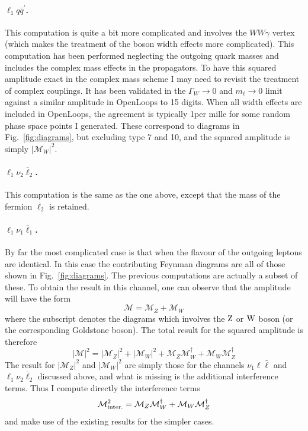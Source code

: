 \documentclass[a4paper,11pt]{article}
\def \beq{\begin{equation}}
\def \eeq{\end{equation}}
\begin{document}
\paragraph{$\ell_1q\bar q^{\prime}$.}
This computation is quite a bit more complicated and involves the $WW\gamma$ vertex (which makes the treatment of the \PW boson width effects more complicated). This computation has been performed neglecting the outgoing quark masses and includes the complex mass effects in the propagators. To have this squared amplitude exact in the complex mass scheme I may need to revisit the treatment of complex couplings. It has been validated in the $\Gamma_W \to 0$ and $m_{\ell}\to0$ limit against a similar amplitude in OpenLoops to 15 digits. When all width effects are included in OpenLoops, the agreement is typically 1per mille for some random phase space points I generated. These correspond to diagrams in Fig.~\ref{fig:diagrams}, but excluding type 7 and 10, and the squared amplitude is simply $|\mathcal{M}_W|^2$.

\paragraph{$\ell_1 \nu_2 \bar\ell_2$.}
This computation is the same as the one above, except that the mass of the fermion $\ell_2$ is retained.

\paragraph{$\ell_1 \nu_1 \bar\ell_1$.}
By far the most complicated case is that when the flavour of the outgoing leptons are identical.
%
In this case the contributing Feynman diagrams are all of those shown in Fig.~\ref{fig:diagrams}.
%
The previous computations are actually a subset of these. To obtain the result in this channel, one can observe that the amplitude will have the form
%
\beq
\mathcal{M} = \mathcal{M}_Z + \mathcal{M}_W
\eeq
%
where the subscript denotes the diagrams which involves the ${\mathrm{Z}}$ or ${\mathrm{W}}$ boson (or the corresponding Goldstone boson). The total result for the squared amplitude is therefore
%
\beq
|\mathcal{M}|^2 = |\mathcal{M}_Z|^2 + |\mathcal{M}_W|^2 +\mathcal{M}_Z \mathcal{M}_W^{\dagger} + \mathcal{M}_W \mathcal{M}_Z^{\dagger}
\eeq
%
The result for $|\mathcal{M}_Z|^2$ and $|\mathcal{M}_W|^2$ are simply those for the channels $\nu_1 \ell \bar \ell$ and $\ell_1 \nu_2 \bar \ell_2$ discussed above, and what is missing is the additional interference terms.
%
Thus I compute directly the interference terms 
%
\beq
\mathcal{M}^2_{\rm inter.} = \mathcal{M}_Z \mathcal{M}_W^{\dagger} + \mathcal{M}_W \mathcal{M}_Z^{\dagger}
\eeq
and make use of the existing results for the simpler cases.
\end{document}
